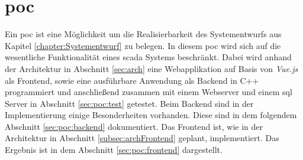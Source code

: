 \chapter{\acl{poc}}
Ein \ac{poc} ist eine Möglichkeit um die Realisierbarkeit des Systementwurfs aus Kapitel \ref{chapter:Systementwurf} zu belegen.
In diesem  \ac{poc} wird sich auf die wesentliche Funktionalität eines \ac{scada} Systems beschränkt.
Dabei wird anhand der Architektur in Abschnitt \ref{sec:arch} eine Webapplikation auf Basis von \emph{Vue.js} als Frontend, 
sowie eine ausführbare Anwendung als Backend in C++ programmiert und anschließend zusammen mit einem Webserver und einem \ac{sql} Server in Abschnitt \ref{sec:poc:test} getestet.
Beim Backend sind in der Implementierung einige Besonderheiten vorhanden.
Diese sind in dem folgendem Abschnitt \ref{sec:poc:backend} dokumentiert.
Das Frontend ist, wie in der Architektur in Abschnitt \ref{subsec:archFrontend} geplant, implementiert.
Das Ergebnis ist in dem Abschnitt \ref{sec:poc:frontend} dargestellt.



